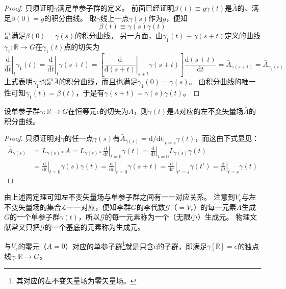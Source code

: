 \begin{proof}
    只须证明$\gamma$满足单参子群的定义。
    前面已经证明$\beta(t) \equiv g\gamma(t)$是$\bar A$的、满足$\beta(0) = g$的积分曲线。
    取$\gamma$线上一点$\gamma(s)$作为$g$，便知
    $$\beta(t) \equiv \gamma(s)\gamma(t)$$
    是满足$\beta(0) = \gamma(s)$的积分曲线。
    另一方面，由$\gamma_1(t) \equiv \gamma(s + t)$定义的曲线$\gamma_1 \colon \mathbb{R} \to G$在$\gamma_1(t)$点的切矢为
    $$\left.\frac{\mathrm{d}}{\mathrm{d}t}\right|_t\gamma_1(t) = \left.\frac{\mathrm{d}}{\mathrm{d}t}\right|_t\gamma(s + t) = \left[\left.\frac{\mathrm{d}}{\mathrm{d}(s + t)}\right|_{s + t}\gamma(s + t)\right]\frac{\mathrm{d}(s + t)}{\mathrm{d}t} = \bar A_{\gamma(s + t)} = \bar A_{\gamma_1(t)}$$
    上式表明$\gamma_1$也是$\bar A$的积分曲线，而且也满足$\gamma_1(0) = \gamma(s)$。
    由积分曲线的唯一性可知$\gamma_1(t) = \beta(t)$，于是有$\gamma(s + t) = \gamma(s)\gamma(t)$。
\end{proof}

\begin{theorem}
    设单参子群$\gamma \colon \mathbb{R} \to G$在恒等元$e$的切矢为$A$，则$\gamma(t)$是$A$对应的左不变矢量场$\bar A$的积分曲线。
\end{theorem}

\begin{proof}
    只须证明对$\gamma$的任一点$\gamma(s)$有$\bar A_{\gamma(s)} = \mathrm{d} / \mathrm{d}t|_{t = s}\gamma(t)$，而这由下式显见：
    \[\begin{aligned}
        \bar A_{\gamma(s)} & = L_{\gamma(s)*}A = L_{\gamma(s)*}\left.\frac{\mathrm{d}}{\mathrm{d}t}\right|_{t = 0}\gamma(t) = \left.\frac{\mathrm{d}}{\mathrm{d}t}\right|_{t = 0}L_{\gamma(s)}\gamma(t) \\
        & = \left.\frac{\mathrm{d}}{\mathrm{d}t}\right|_{t = 0}\gamma(s)\gamma(t) = \left.\frac{\mathrm{d}}{\mathrm{d}t}\right|_{t = 0}\gamma(s + t) = \left.\frac{\mathrm{d}}{\mathrm{d}t'}\right|_{t' = s}\gamma(t') = \left.\frac{\mathrm{d}}{\mathrm{d}t}\right|_{t = s}\gamma(t)
    \end{aligned}\]
\end{proof}

由上述两定理可知左不变矢量场与单参子群之间有一一对应关系。
注意到$V_e$与左不变矢量场的集合$\mathscr{L}$一一对应，便知李群$G$的李代数$\mathscr{G}$（$=V_e$）的每一元素$A$生成$G$的一个单参子群$\gamma(t)$，所以$\mathscr{G}$的每一元素称为一个（无限小）生成元。
物理文献常又只把$\mathscr{G}$的一个基底的元素称为生成元。

\begin{note}
    与$V_e$的零元（$A = 0$）对应的单参子群\footnote{
        其对应的左不变矢量场为零矢量场。
    }就是只含$e$的子群，即满足$\gamma[\mathbb{R}] = e$的独点线$\gamma \colon \mathbb{R} \to G$。
\end{note}


